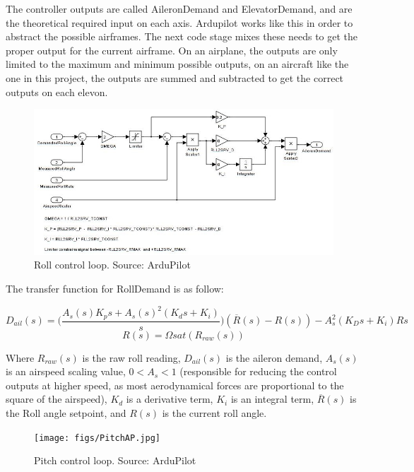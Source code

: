 The controller outputs are called AileronDemand and ElevatorDemand, and are the theoretical required input on each axis. Ardupilot works like this in order to abstract the possible airframes. The next code stage mixes these needs to get the proper output for the current airframe.
On an airplane, the outputs are only limited to the maximum and minimum possible outputs, on an aircraft like the one in this project, the outputs are summed and subtracted to get the correct outputs on each elevon.


\begin{figure}[H]
\centering
  \includegraphics[width=\linewidth]{figs/roll_control_loop.jpg}
  \caption{Roll control loop. Source: ArduPilot}
  \label{fig:roll_loop}
\end{figure}

The transfer function for RollDemand is as follow:

\begin{equation}
D_{ail}(s) = \bigg(\frac{A_s(s) K_p s + A_s(s)^2(K_d s + K_i)}{s}\bigg)(\overline{R}(s) - R(s)) - A_s^2(K_D s + K_i)Rs
\end{equation}
\begin{equation}
R(s) = \Omega sat(R_{raw}(s))
\end{equation}

Where $R_{raw}(s)$ is the raw roll reading, $D_{ail}(s)$ is the aileron demand, $A_s(s)$ is an airspeed scaling value, $0 < A_s < 1$ (responsible for reducing the control outputs at higher speed, as most aerodynamical forces are proportional to the square of the airspeed), $K_d$ is a derivative term, $K_i$ is an integral term, $\overline{R}(s)$ is the Roll angle setpoint, and $R(s)$ is the current roll angle.


\begin{figure}[H]
\centering
  \texttt{[image: figs/PitchAP.jpg]}
  \caption{Pitch control loop. Source: ArduPilot}
  \label{fig:pitch_loop}
\end{figure}

